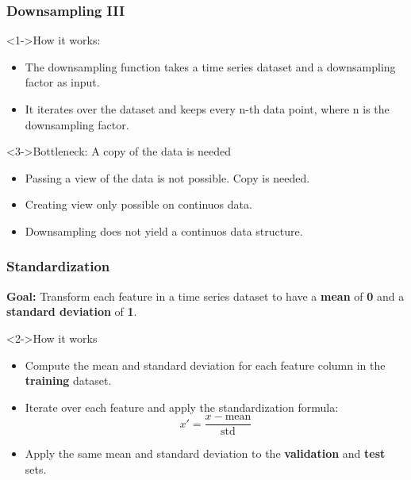 \documentclass[t,english]{beamer}
\begin{document}
\begin{frame}
  \frametitle{Downsampling III}
  \begin{block}<1->{How it works:}
    \begin{itemize}
      \item<1-> The downsampling function takes a time series dataset and a downsampling factor as input.
      \item<2-> It iterates over the dataset and keeps every n-th data point, where n is the downsampling factor.
    \end{itemize}
  \end{block}

  \begin{block}<3->{Bottleneck: A copy of the data is needed}
    \begin{itemize}
      \item<3-> Passing a view of the data is not possible. Copy is needed.
      \item <4-> Creating view only possible on continuos data.
      \item <5-> Downsampling does not yield a continuos data structure.
    \end{itemize}
  \end{block}
\end{frame}

\begin{frame}
  \frametitle{Standardization}
  \textbf{Goal:} Transform each feature in a time series dataset to have a \textbf{mean} of \textbf{0} and a \textbf{standard deviation} of \textbf{1}.

  \begin{block}<2->{How it works}
    \begin{itemize}
      \item<2-> Compute the mean and standard deviation for each feature column in the \textbf{training} dataset.
      \item<3-> Iterate over each feature and apply the standardization formula:
            \begin{equation}
              x' = \frac{x - \text{mean}}{\text{std}}
            \end{equation}
      \item<4-> Apply the same mean and standard deviation to the \textbf{validation} and \textbf{test} sets.
    \end{itemize}
  \end{block}
\end{frame}
\end{document}
